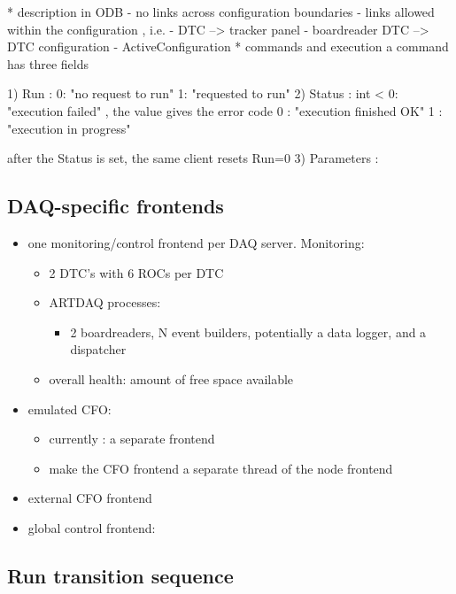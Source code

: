 * description in ODB                                                         
- no links across configuration boundaries
- links allowed within the configuration , i.e.
  - DTC --> tracker panel
  - boardreader DTC --> DTC configuration
- ActiveConfiguration
* commands and execution
 a command has three fields
 
1) Run     : 0: "no request to run"  1: "requested to run" 
2) Status  : int
   < 0: "execution failed" , the value gives the error code
   0  : "execution finished OK"
   1  : "execution in progress"

   after the Status is set, the same client resets Run=0
3) Parameters :


\subsection{DAQ-specific frontends}

\begin{itemize}
\item
  one monitoring/control frontend per DAQ server. Monitoring:
  \begin{itemize}
  \item
    2 DTC's with 6 ROCs per DTC
  \item
    ARTDAQ processes:
    \begin{itemize}
    \item
      2 boardreaders, N event builders, potentially a data logger, and a dispatcher
    \end{itemize}
  \item
    overall health: amount of free space available
  \end{itemize}
\item
  emulated CFO:
  \begin{itemize}
  \item
    currently : a separate frontend 
  \item 
    make the CFO frontend a separate thread of the node frontend
  \end{itemize}
\item
  external CFO frontend 
\item
  global control frontend:
\end{itemize}

\subsection{Run transition sequence}

